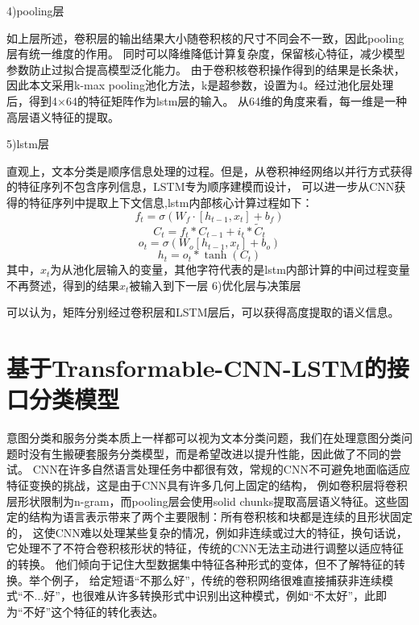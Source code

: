   4)pooling层

    如上层所述，卷积层的输出结果大小随卷积核的尺寸不同会不一致，因此pooling层有统一维度的作用。
    同时可以降维降低计算复杂度，保留核心特征，减少模型参数防止过拟合提高模型泛化能力。
    由于卷积核卷积操作得到的结果是长条状，因此本文采用k-max pooling池化方法，k是超参数，设置为4。经过池化层处理后，得到4×64的特征矩阵作为lstm层的输入。
  从64维的角度来看，每一维是一种高层语义特征的提取。

    5)lstm层

  直观上，文本分类是顺序信息处理的过程。但是，从卷积神经网络以并行方式获得的特征序列不包含序列信息，LSTM专为顺序建模而设计，
  可以进一步从CNN获得的特征序列中提取上下文信息,lstm内部核心计算过程如下：
  \begin{equation}
  f_{t}=σ(W_{f}\cdot[h_{t-1},x_t]+b_{f})
  \end{equation}
  \begin{equation}
    C_{t}=f_{t} * C_{t-1}+i_{t} * \tilde{C}_{t}
    \end{equation} 
    \begin{equation}
      o_{t}=\sigma\left(W_{o}\left[h_{t-1}, x_{t}\right]+b_{o}\right)
    \end{equation} 
    \begin{equation}
      h_{t}=o_{t} * \tanh \left(C_{t}\right)
    \end{equation}
    其中，$x_t$为从池化层输入的变量，其他字符代表的是lstm内部计算的中间过程变量不再赘述，得到的结果$x_t$被输入到下一层
  6)优化层与决策层


可以认为，矩阵分别经过卷积层和LSTM层后，可以获得高度提取的语义信息。



\section{基于Transformable-CNN-LSTM的接口分类模型}
意图分类和服务分类本质上一样都可以视为文本分类问题，我们在处理意图分类问题时没有生搬硬套服务分类模型，而是希望改进以提升性能，因此做了不同的尝试。
CNN在许多自然语言处理任务中都很有效，常规的CNN不可避免地面临适应特征变换的挑战，这是由于CNN具有许多几何上固定的结构，
例如卷积层将卷积层形状限制为n-gram，而pooling层会使用solid chunks提取高层语义特征。这些固定的结构为语言表示带来了两个主要限制：所有卷积核和块都是连续的且形状固定的，
这使CNN难以处理某些复杂的情况，例如非连续或过大的特征，换句话说，它处理不了不符合卷积核形状的特征，传统的CNN无法主动进行调整以适应特征的转换。
他们倾向于记住大型数据集中特征各种形式的变体，但不了解特征的转换。举个例子，
给定短语“不那么好”，传统的卷积网络很难直接捕获非连续模式“不...好”，也很难从许多转换形式中识别出这种模式，例如“不太好”，此即为“不好”这个特征的转化表达。

